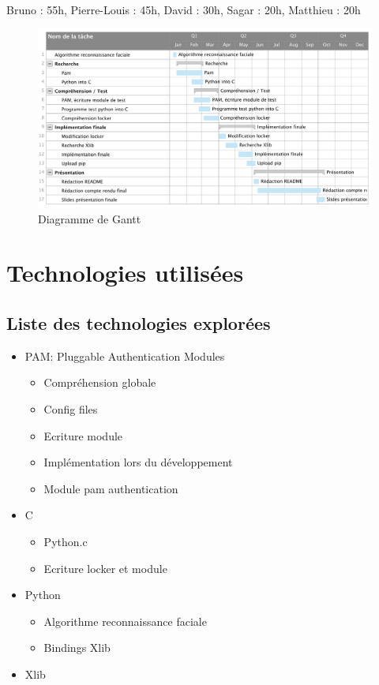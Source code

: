 \documentclass[french]{report}
\begin{document}
\vspace{0.5cm}
Bruno : 55h, Pierre-Louis : 45h, David : 30h, Sagar : 20h, Matthieu : 20h

\begin{figure}[h]\label{fig:gantt2}
  \includegraphics[width=\linewidth]{gantt2}
  \caption{Diagramme de Gantt}
  \label{fig:gantt2}
\end{figure}


\chapter{Technologies utilisées}

\newpage

\section{Liste des technologies explorées}

\begin{itemize}[label=\textbullet, font=\normalfont \color{blue}]
  \item{PAM: Pluggable Authentication Modules}
  \begin{itemize}[label=\textbullet]
    \item{Compréhension globale}
    \item{Config files}
    \item{Ecriture module}
    \item{Implémentation lors du développement}
    \item{Module pam authentication}
  \end{itemize}
  \item{C}
  \begin{itemize}[label=\textbullet]
    \item{Python.c}
    \item{Ecriture locker et module}
  \end{itemize}
  \item{Python}
  \begin{itemize}[label=\textbullet]
    \item{Algorithme reconnaissance faciale}
    \item{Bindings Xlib}
  \end{itemize}
  \item{Xlib}
\end{itemize}
\end{document}
